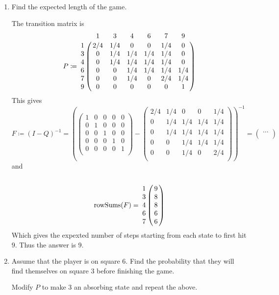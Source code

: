 \documentclass{article}
\DeclareMathOperator\rowSums{rowSums}
\begin{document}
\begin{enumerate}[label=(\alph*)]
	\item Find the expected length of the game.

		The transition matrix is
		\begin{equation}
			P \coloneqq \bordermatrix{~ & 1 & 3 & 4 & 6 & 7 & 9 \cr
			1 & 2/4 & 1/4 & 0 & 0 & 1/4 & 0 \cr
			3 & 0 & 1/4 & 1/4 & 1/4 & 1/4 & 0 \cr
			4 & 0 & 1/4 & 1/4 & 1/4 & 1/4 & 0 \cr
			6 & 0 & 0 & 1/4 & 1/4 & 1/4 & 1/4 \cr
			7 & 0 & 0 & 1/4 & 0 & 2/4 & 1/4 \cr
			9 & 0 & 0 & 0 & 0 & 0 & 1 \cr
			}
		\end{equation}
		This gives
		$$ F \coloneqq (I - Q)^{-1} = \left(\begin{pmatrix}
			1 & 0 & 0 & 0 & 0 \\
			0 & 1 & 0 & 0 & 0 \\
			0 & 0 & 1 & 0 & 0 \\
			0 & 0 & 0 & 1 & 0 \\
			0 & 0 & 0 & 0 & 1 \\
		\end{pmatrix} - \begin{pmatrix}
			2/4 & 1/4 & 0 & 0 & 1/4 \\
			0 & 1/4 & 1/4 & 1/4 & 1/4 \\
			0 & 1/4 & 1/4 & 1/4 & 1/4 \\
			0 & 0 & 1/4 & 1/4 & 1/4 \\
			0 & 0 & 1/4 & 0 & 2/4 \\
		\end{pmatrix}\right)^{-1}
		= \begin{pmatrix}
			\cdots \\
		\end{pmatrix}
		$$
		and
		$$ \rowSums(F) = \bordermatrix{
			~ & ~ \cr
			1 & 9 \cr
			3 & 8 \cr
			4 & 8 \cr
			6 & 6 \cr
			7 & 6 \cr
			} $$
			Which gives the expexted number of steps starting from each state
			to first hit $9$.
			Thus the answer is $9$.

		\item Assume that the player is on square 6.
			Find the probability that they will find themselves on square 3 before finishing the game.

			Modify $P$ to make $3$ an absorbing state and repeat the above.
\end{enumerate}
\end{document}
